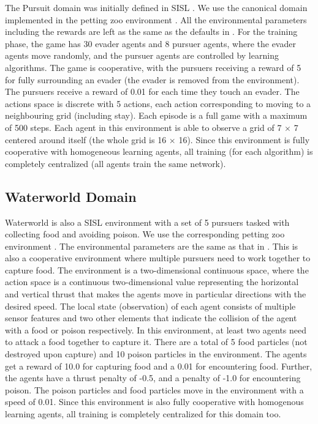 \documentclass[jair, twoside,11pt,theapa]{article}
\begin{document}
The Pursuit domain was initially defined in SISL \citep{gupta2017cooperative}. We use the canonical domain implemented in the petting zoo environment \citep{terry2020pettingzoo}. All the environmental parameters including the rewards are left as the same as the defaults in \cite{gupta2017cooperative}. For the training phase, the game has 30 evader agents and 8 pursuer agents, where the evader agents move randomly, and the pursuer agents are controlled by learning algorithms. The game is cooperative, with the pursuers receiving a reward of 5 for fully surrounding an evader (the evader is removed from the environment). The pursuers receive a reward of 0.01 for each time they touch an evader. The actions space is discrete with 5 actions, each action corresponding to moving to a neighbouring grid (including stay). Each episode is a full game with a maximum of 500 steps. Each agent in this environment is able to observe a grid of 7 $\times$ 7 centered around itself (the whole grid is 16 $\times$ 16). Since this environment is fully cooperative with homogeneous learning agents, all training (for each algorithm) is completely centralized (all agents train the same network). 



\subsection{Waterworld Domain}

Waterworld is also a SISL environment with a set of 5 pursuers tasked with collecting food and avoiding poison. We use the corresponding petting zoo environment \citep{terry2020pettingzoo}. The environmental parameters are the same as that in \cite{gupta2017cooperative}. This is also a cooperative environment where multiple pursuers need to work together to capture food. The environment is a two-dimensional continuous space, where the action space is a continuous two-dimensional value representing the horizontal and vertical thrust that makes the agents move in particular directions with the desired speed. The local state (observation) of each agent consists of multiple sensor features and two other elements that indicate the collision of the agent with a food or poison respectively. In this environment, at least two agents need to attack a food together to capture it. There are a total of 5 food particles (not destroyed upon capture) and 10 poison particles in the environment. The agents get a reward of 10.0 for capturing food and a 0.01 for encountering food. Further, the agents have a thrust penalty of -0.5, and a penalty of -1.0 for encountering poison. The poison particles and food particles move in the environment with a speed of 0.01. Since this environment is also fully cooperative with homogenous learning agents, all training is completely centralized for this domain too.
\end{document}
